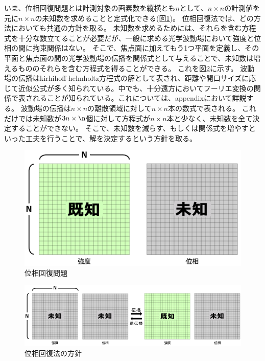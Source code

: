 \documentclass[dvipdfmx,autodetect-engine]{jreport}
\begin{document}
いま、位相回復問題とは計測対象の画素数を縦横とも$n$として、$n \times n$の計測値を元に$n \times n$の未知数を求めることと定式化できる(図\ref{fig:phase_retrieval_problem})。
位相回復法では、どの方法においても共通の方針を取る。
未知数を求めるためには、それらを含む方程式を十分な数立てることが必要だが、一般に求める光学波動場において強度と位相の間に拘束関係はない。
そこで、焦点面に加えてもう1つ平面を定義し、その平面と焦点面の間の光学波動場の伝播を関係式として与えることで、未知数は増えるもののそれらを含む方程式を得ることができる。
これを図\ref{fig:phase_retrieval_policy}に示す。
波動場の伝播はkirhihoff-helmholtz方程式の解として表され、距離や開口サイズに応じて近似公式が多く知られている。中でも、十分遠方においてフーリエ変換の関係で表されることが知られている。これについては、appendixにおいて詳説する。
波動場の伝播は$n \times n$の離散領域に対して$n \times n$本の数式で表される。
これだけでは未知数が$3n \times \n$個に対して方程式が$n \times n$本と少なく、未知数を全て決定することができない。
そこで、未知数を減らす、もしくは関係式を増やすといった工夫を行うことで、解を決定するという方針を取る。

\begin{figure}[h!]
\centering
\includegraphics[scale=0.5]{images/phase_retrieval/phase_retrieval_problem.png}
\caption{位相回復問題}
\label{fig:phase_retrieval_problem}
\end{figure}

\begin{figure}[h!]
\centering
\includegraphics[scale=0.5]{images/phase_retrieval/phase_retrieval_policy.png}
\caption{位相回復法の方針}
\label{fig:phase_retrieval_policy}
\end{figure}
\end{document}

